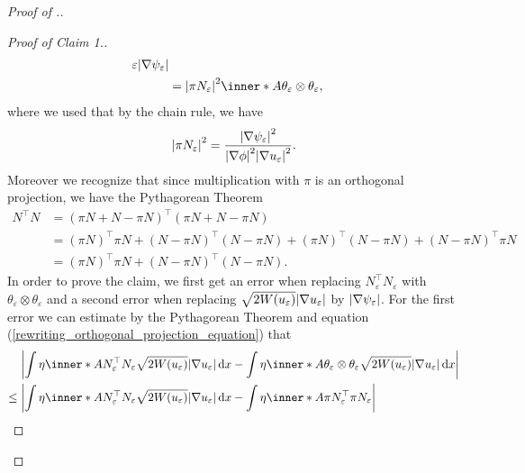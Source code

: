\begin{proof}[Proof of .]
\begin{proof}[Proof of Claim 1.]
\begin{align}
{{{							\varepsilon } }{ 
					\abs{ \nabla \psi_{ \varepsilon } } } }
			\\
			\label{rewriting_orthogonal_projection_equation}
			& = 
			\abs{ \pi N_{ \varepsilon } }^{ 2 }
			\inner*{ A }{ \theta_{ \varepsilon } \otimes \theta_{ \varepsilon } 
			},
		\end{align}
		where we used that by the chain rule, we have
		\begin{equation*}
			\abs{ \pi N_{ \varepsilon } }^{ 2 }
			=
			\frac{ \abs{ \nabla \psi_{ \varepsilon } }^{ 2 } }{ \abs{ \nabla 
					\phi }^{ 2 } \abs{ \nabla u_{ \varepsilon } }^{ 2 } }.
		\end{equation*}
		Moreover we recognize that since multiplication with $ \pi $ is 
		an orthogonal projection, we have the Pythagorean Theorem
		\begin{align*}
			N^{ \top } N 
			& =
			( \pi N + N - \pi N )^{ \top } ( \pi N + N - \pi N )
			\\
			& =
			( \pi N )^{ \top } \pi N 
			+
			( N - \pi N )^{ \top } ( N - \pi N )
			+
			( \pi N )^{ \top } ( N - \pi N )
			+
			( N - \pi N )^{ \top } \pi N 
			\\
			& =
			( \pi N )^{ \top } \pi N
			+
			( N - \pi N )^{ \top } ( N - \pi N ).
		\end{align*}
		In order to prove the claim, we first get an error when replacing $ N_{ 
			\varepsilon }^{ \top } N_{ \varepsilon } $ with 
		$ \theta_{ \varepsilon 
			} 
		\otimes \theta_{ \varepsilon } $ 
		and a second error when replacing 
		$ \sqrt{ 2 W ( u_{ \varepsilon } ) } \abs{ \nabla u_{ \varepsilon } } $ 
		by $ \abs{ \nabla \psi_{ \varepsilon } } $.
		For the first error we can estimate by the Pythagorean Theorem and 
		equation (\ref{rewriting_orthogonal_projection_equation}) that
		\begin{align*}
			& \abs{ 
				\int
				\eta 
				\inner*{ A }{ N_{ \varepsilon }^{ \top } N_{ \varepsilon } }
				\sqrt{ 2 W ( u_{ \varepsilon } ) } \abs{ \nabla u_{ 
						\varepsilon } }
				\dd{ x }
				-
				\int
				\eta
				\inner*{ A }{ \theta_{ \varepsilon } \otimes \theta_{ 
				\varepsilon 
				} }
				\sqrt{ 2 W ( u_{ \varepsilon } ) } \abs{ \nabla u_{ 
						\varepsilon } }
				\dd{ x }
			}
			\\
			\leq{} &
			\abs{ 
				\int
				\eta 
				\inner*{ A }{ N_{ \varepsilon }^{ \top } N_{ \varepsilon } }
				\sqrt{ 2 W ( u_{ \varepsilon } ) } \abs{ \nabla u_{ 
						\varepsilon } } 
				\dd{ x }
				-
				\int 
				\eta
				\inner*{ A }
				{ \pi N_{ \varepsilon }^{ \top } \pi N_{ \varepsilon } }
}
\end{align*}
\end{proof}
\end{proof}
